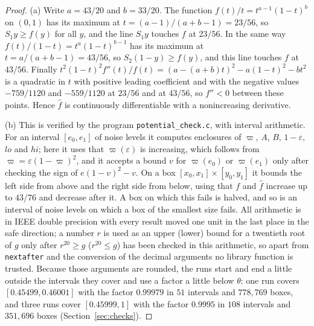 \documentclass[11pt]{amsart}
\theoremstyle{definition}
\theoremstyle{remark}
\newcommand{\eps}{\varepsilon}
\begin{document}
\begin{proof}
(a) Write $a=43/20$ and $b=33/20$. The function $f(t)/t=t^{a-1}(1-t)^b$ on $(0,1)$ has its maximum
at $t=(a-1)/(a+b-1)=23/56$, so $S_1y\ge f(y)$ for all $y$, and the line $S_1y$ touches $f$ at
$23/56$. In the same way $f(t)/(1-t)=t^a(1-t)^{b-1}$ has its maximum at $t=a/(a+b-1)=43/56$, so
$S_2(1-y)\ge f(y)$, and this line touches $f$ at $43/56$. Finally
$t^2(1-t)^2f''(t)/f(t)=(a-(a+b)t)^2-a(1-t)^2-bt^2$ is a quadratic in $t$ with positive leading
coefficient and with the negative values $-759/1120$ and $-559/1120$ at $23/56$ and at $43/56$, so
$f''<0$ between these points. Hence $\hat f$ is continuously differentiable with a nonincreasing
derivative.

(b) This is verified by the program \texttt{potential\_check.c}, with interval arithmetic. For an
interval $[e_0,e_1]$ of noise levels it computes enclosures of $\varpi$, $A$, $B$, $1-\eps$, $lo$
and $hi$; here it uses that $\varpi(\eps)$ is increasing, which follows from
$\varpi=\eps(1-\varpi)^2$, and it accepts a bound $v$ for $\varpi(e_0)$ or $\varpi(e_1)$ only
after checking the sign of $e(1-v)^2-v$. On a box $[x_0,x_1]\times[y_0,y_1]$ it bounds the left
side from above and the right side from below, using that $f$ and $\hat f$ increase up to $43/76$
and decrease after it. A box on which this fails is halved, and so is an interval of noise levels
on which a box of the smallest size fails. All arithmetic is in IEEE double precision with every
result moved one unit in the last place in the safe direction; a number $r$ is used as an upper
(lower) bound for a twentieth root of $g$ only after $r^{20}\ge g$ ($r^{20}\le g$) has been
checked in this arithmetic, so apart from \texttt{nextafter} and the conversion of the decimal
arguments no library function is trusted. Because those arguments are rounded, the runs start and
end a little outside the intervals they cover and use a factor a little below $\theta$: one run
covers $[0.45499,0.46001]$ with the factor $0.99979$ in $51$ intervals and $778{,}769$ boxes, and
three runs cover $[0.45999,1]$ with the factor $0.9995$ in $108$ intervals and $351{,}696$ boxes
(Section~\ref{sec:checks}).
\end{proof}
\end{document}

